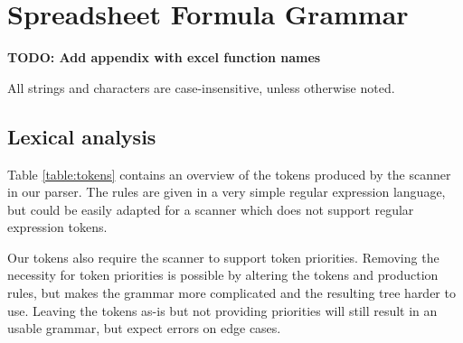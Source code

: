 \documentclass[conference]{IEEEtran}
\newcommand{\todo}[1]{\textbf{TODO: #1}}
\begin{document}
\section{Spreadsheet Formula Grammar}
\label{section:grammar}

\todo{Add appendix with excel function names}

All strings and characters are case-insensitive, unless otherwise noted.

\subsection{Lexical analysis}

Table \ref{table:tokens} contains an overview of the tokens produced by the scanner in our parser. The rules are given in a very simple regular expression language, but could be easily adapted for a scanner which does not support regular expression tokens. 

Our tokens also require the scanner to support token priorities. Removing the necessity for token priorities is possible by altering the tokens and production rules, but makes the grammar more complicated and the resulting tree harder to use. Leaving the tokens as-is but not providing priorities will still result in an usable grammar, but expect errors on edge cases.
\end{document}
